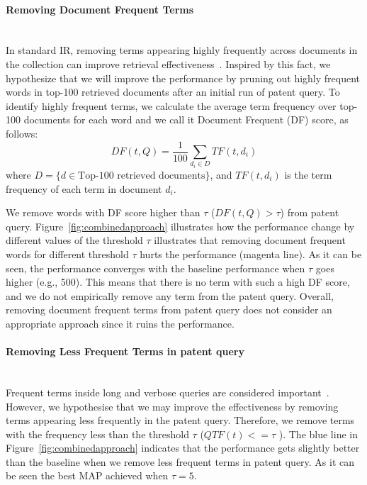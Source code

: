 \paragraph{Removing Document Frequent Terms}
\ \\
In standard IR, removing terms appearing highly frequently across documents in the collection can improve retrieval effectiveness~\citep{manning2008introduction}. Inspired by this fact, we hypothesize that we will improve the performance by pruning out highly frequent words in top-100 retrieved documents after an initial run of patent query. To identify highly frequent terms, we calculate the average term frequency over top-100 documents for each word and we call it Document Frequent (DF) score, as follows:
\begin{equation}
 DF(t, Q)=\frac{1}{100}\sum_{d_i\in  D} TF(t, d_i)    
 \label{eq:df}
\end{equation}
where $D=\{d\in \mbox{Top-100 retrieved documents}\}$, and $TF(t, d_i)$ is the term frequency of each term in document $d_i$.

We remove words with DF score higher than $\tau$ ($DF(t, Q)>\tau$) from patent query. Figure~\ref{fig:combinedapproach} illustrates how the performance change by different values of the threshold $\tau$ illustrates that removing document frequent words for different threshold $\tau$ hurts the performance (magenta line). As it can be seen, the performance converges with the baseline performance when $\tau$ goes higher (e.g., 500). This means that there is no term with such a high DF score, and we do not empirically remove any term from the patent query. Overall, removing document frequent terms from patent query does not consider an appropriate approach since it ruins the performance. 
\paragraph{Removing Less Frequent Terms in patent query}
\ \\
Frequent terms inside long and verbose queries are considered important~\citep{maxwell2013compact}. However, we hypothesise that we may improve the effectiveness by removing terms appearing less frequently in the patent query. Therefore, we remove terms with the frequency less than the threshold $\tau$ ($QTF(t)<=\tau$ ). The blue line in Figure~\ref{fig:combinedapproach} indicates that the performance gets slightly better than the baseline when we remove less frequent terms in patent query. As it can be seen the best MAP achieved when $\tau=5$. 
